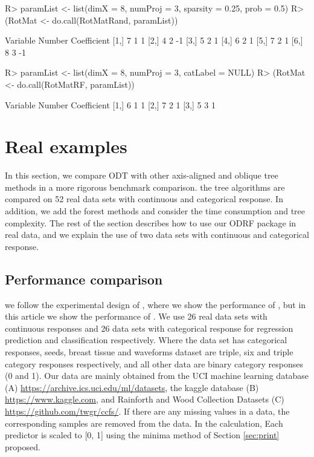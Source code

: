 \documentclass[nojss]{jss}
\numberwithin{equation}{section}
\begin{document}
\begin{Schunk}
\begin{Sinput}
R> paramList <- list(dimX = 8, numProj = 3, sparsity = 0.25, prob = 0.5)
R> (RotMat <- do.call(RotMatRand, paramList))
\end{Sinput}
\begin{Soutput}
     Variable Number Coefficient
[1,]        7      1           1
[2,]        4      2          -1
[3,]        5      2           1
[4,]        6      2           1
[5,]        7      2           1
[6,]        8      3          -1
\end{Soutput}
\begin{Sinput}
R> paramList <- list(dimX = 8, numProj = 3, catLabel = NULL)
R> (RotMat <- do.call(RotMatRF, paramList))
\end{Sinput}
\begin{Soutput}
     Variable Number Coefficient
[1,]        6      1           1
[2,]        7      2           1
[3,]        5      3           1
\end{Soutput}
\end{Schunk}

\section{Real examples} \label{sec:examples}
In this section, we compare ODT with other axis-aligned and oblique tree methods in a more rigorous benchmark comparison. the tree algorithms are compared on 52 real data sets with continuous and categorical response. In addition, we add the forest methods and consider the time consumption and tree complexity. The rest of the section describes how to use our ODRF package in real data, and we explain the use of two data sets with continuous and categorical response.

\subsection{Performance comparison}
we follow the experimental design of \cite{zhan2022consistency}, where we show the performance of  , but in this article we show the performance of . We use 26 real data sets with continuous responses  and 26 data sets with categorical response for regression prediction and classification respectively. Where the data set has categorical responses, seeds, breast tissue and waveforms dataset are triple, six and triple category responses respectively, and all other data are binary category responses (0 and 1). Our data are mainly obtained from the UCI machine learning database (A) \url{https://archive.ics.uci.edu/ml/datasets}, the kaggle database (B) \url{https://www.kaggle.com}, and Rainforth and Wood \cite{rainforth2015canonical} Collection Datasets (C) \url{https://github.com/twgr/ccfs/}.
If there are any missing values in a data, the corresponding samples are removed from the data. In the calculation, Each predictor is scaled to [0, 1] using the minima method of Section \ref{sec:print} proposed.
\end{document}
